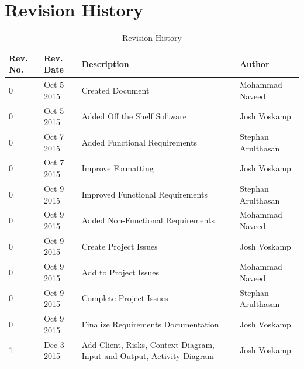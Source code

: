 \documentclass[12pt]{article}
\begin{document}
\begin{titlepage}



\vfill %

\end{titlepage}

\newpage
\tableofcontents
\newpage
\listoftables
{}
\newpage
\listoffigures
{}
\newpage

\section*{Revision History}
\begin{table}[H]
	\centering
	\begin{tabular}{ | p{2cm} |  p{2cm} | p{5cm} | p{3.8cm} |}
		\hline
		Rev. No. & Rev. Date & Description & Author \\\hline
		0 & Oct 5 2015 & Created Document & Mohammad Naveed \\\hline
		0 & Oct 5 2015 & Added Off the Shelf Software & Josh Voskamp \\\hline
		0 & Oct 7 2015 & Added Functional Requirements & Stephan Arulthasan\\\hline
		0 & Oct 7 2015 & Improve Formatting & Josh Voskamp \\\hline
		0 & Oct 9 2015 & Improved Functional Requirements & Stephan Arulthasan \\\hline
		0 & Oct 9 2015 & Added Non-Functional Requirements & Mohammad Naveed \\\hline
		0 & Oct 9 2015 & Create Project Issues & Josh Voskamp \\\hline
		0 & Oct 9 2015 & Add to Project Issues & Mohammad Naveed \\\hline
		0 & Oct 9 2015 & Complete Project Issues & Stephan Arulthasan \\\hline
		0 & Oct 9 2015 & Finalize Requirements Documentation & Josh Voskamp \\\hline
        \color{red} 1 &\color{red} Dec 3 2015 &\color{red} Add Client, Risks, Context Diagram, Input and Output, Activity Diagram &\color{red} Josh Voskamp \\\hline
	\end{tabular}
	\caption{Revision History}
\end{table}
\newpage
\end{document}
